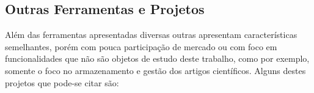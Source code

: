 	

\subsection{Outras Ferramentas e Projetos}
\label{ssec:other-tools}

\begin{textnew}

Além das ferramentas apresentadas diversas outras apresentam características semelhantes, porém com pouca participação de mercado ou com foco em funcionalidades que não são objetos de estudo deste trabalho, como por exemplo, somente o foco no armazenamento e gestão dos artigos científicos. Alguns destes projetos que pode-se citar são:


\end{textnew}
